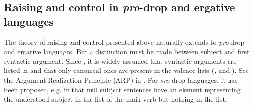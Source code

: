 



\subsection{Raising and control in \emph{pro}-drop and ergative languages}

The theory of raising and control presented above naturally extends to \emph{pro}-drop and ergative
languages.  But a distinction must be made between subject and first syntactic argument. Since \citet*{BMS2001a}, it is widely assumed
  that syntactic arguments are listed in \argst and
that only canonical ones are present in the valence lists (\subj, \spr and \comps). See the Argument Realization Principle (ARP) in \crossrefchapterw[\pageref{properties:ex-ARP}]{properties}.
For \emph{pro}-drop languages,
it has been proposed, e.g. in \citep[]{ManningandSag1998} that null subject sentences have
an element representing the understood subject in the \argst list of the main verb but nothing in
the \subj list.

